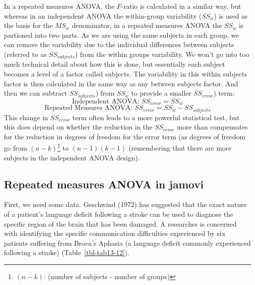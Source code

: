 \documentclass[
  a4paper,
]{book}
\begin{document}
In a repeated measures ANOVA, the \(F\)-ratio is calculated in a similar
way, but whereas in an independent ANOVA the within-group variability
(\(SS_w\)) is used as the basis for the \(MS_w\) denominator, in a
repeated measures ANOVA the \(SS_w\) is partioned into two parts. As we
are using the same subjects in each group, we can remove the variability
due to the individual differences between subjects (referred to as
\(SS_{subjects}\)) from the within groups variability. We won't go into
too much technical detail about how this is done, but essentially each
subject becomes a level of a factor called subjects. The variability in
this within subjects factor is then calculated in the same way as any
between subjects factor. And then we can subtract \(SS_{subjects}\))
from \(SS_w\) to provide a smaller \(SS_{error}\)) term:
\[\text{Independent ANOVA: } SS_{error} = SS_w\]
\[\text{Repeated Measures ANOVA: } SS_{error} = SS_w - SS_{subjects}\]
This change in \(SS_{error}\) term often leads to a more powerful
statistical test, but this does depend on whether the reduction in the
\(SS_{error}\) more than compensates for the reduction in degrees of
freedom for the error term (as degrees of freedom go from
\((n - k)\)\footnote{\((n - k)\): (number of subjects - number of
  groups)} to \((n - 1)(k - 1)\) (remembering that there are more
subjects in the independent ANOVA design).

\hypertarget{repeated-measures-anova-in-jamovi}{%
\subsection{Repeated measures ANOVA in
jamovi}\label{repeated-measures-anova-in-jamovi}}

First, we need some data. Geschwind (1972) has suggested that the exact
nature of a patient's language deficit following a stroke can be used to
diagnose the specific region of the brain that has been damaged. A
researcher is concerned with identifying the specific communication
difficulties experienced by six patients suffering from Broca's Aphasia
(a language deficit commonly experienced following a stroke)
(Table~\ref{tbl-tab13-12}).

\hypertarget{tbl-tab13-12}{}
 
  \providecommand{\huxb}[2]{\arrayrulecolor[RGB]{#1}\global\arrayrulewidth=#2pt}
  \providecommand{\huxvb}[2]{\color[RGB]{#1}\vrule width #2pt}
  \providecommand{\huxtpad}[1]{\rule{0pt}{#1}}
  \providecommand{\huxbpad}[1]{\rule[-#1]{0pt}{#1}}
\end{document}
